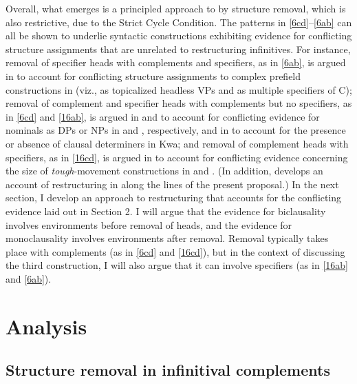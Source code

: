 \documentclass[output=paper]{langsci/langscibook}
\begin{document}
\noindent Overall, what emerges is a principled approach to  by
structure removal, which is also restrictive, due to the Strict Cycle
Condition. The patterns in \eqref{6cd}--\eqref{6ab} can all be shown to
underlie syntactic constructions exhibiting evidence for conflicting structure
assignments that are unrelated to restructuring infinitives. For instance,
removal of specifier heads with complements and specifiers, as in \eqref{6ab}, is
argued in \cite{Mueller:17:pre} to account for conflicting structure
assignments to  complex prefield constructions in  (viz., as topicalized
headless VPs  and as multiple specifiers of C); removal of complement and
specifier heads with complements but no specifiers, as in \eqref{6cd} and
\eqref{16ab}, is argued in \cite{Mueller:15:str} and \cite{Puskar:16} to account
for conflicting evidence for nominals as DPs or NPs in  and
, respectively, and in \cite{Korsah&Murphy:17:aga} to account for
the presence or absence of clausal determiners in Kwa; and removal of
complement heads with specifiers, as in \eqref{16cd}, is argued in
\cite{Schwarzer:16} to account for conflicting evidence concerning the size of
{\it tough}-movement constructions in  and . (In addition,
\citealt{Dschaak:17} develops an account of restructuring in  along the
lines of the present proposal.) In the next section, I develop an approach to
restructuring that accounts for the conflicting evidence laid out in Section 2.
I will argue that the evidence for biclausality involves environments before
removal of  heads, and the evidence for monoclausality involves environments
after removal. Removal typically takes place with complements (as in
\eqref{6cd} and \eqref{16cd}), but in the context of discussing the third
construction, I will also argue that it can involve specifiers (as in
\eqref{16ab} and \eqref{6ab}).

\section{Analysis}\label{sec:32.4}

\subsection{Structure removal in infinitival complements}
\end{document}
